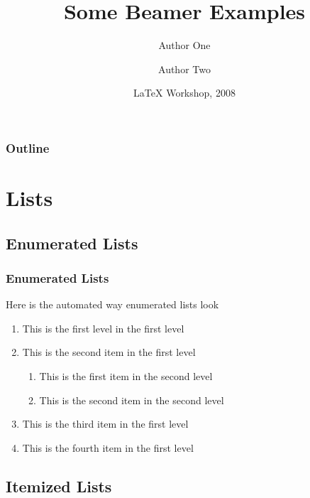 \documentclass[noamsthm]{beamer}
\title[Beamer Examples] %
{Some Beamer Examples}
\author[Author1,Author2] %
{Author One  \and Author Two }
\institute[Concordia] %
{Concordia University}
\date[LaTeX 2008] %
{LaTeX Workshop, 2008}
\begin{document}
\begin{frame}
  \titlepage
\end{frame}

\begin{frame}
  \frametitle{Outline}
  \tableofcontents
\end{frame}

\section{Lists}

\subsection{Enumerated Lists}

\begin{frame}
\frametitle{Enumerated Lists}


Here is the automated way enumerated lists look

\begin{enumerate}
	\item This is the first level in the first level
	\item This is the second item in the first level
	\begin{enumerate}
	\item This is the first item in the second level
	\item This is the second item in the second level

\end{enumerate}
	\item This is the third item in the first level
	\item This is the fourth item in the first level
\end{enumerate}

\end{frame}

\subsection{Itemized Lists}
\end{document}
